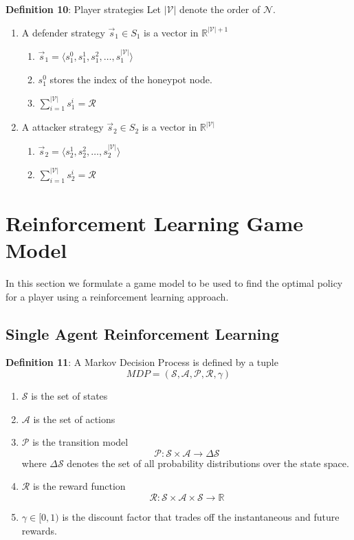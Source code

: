 \documentclass[conference]{IEEEtran}
\begin{document}
\textbf{Definition 10}: Player strategies
Let $|\mathcal{V}|$ denote the order of $\mathcal{N}$.
\begin{enumerate}
\item A defender strategy $\vec{s}_1 \in S_1$ is a vector in $\mathbb{R}^{|\mathcal{V}| + 1}$
\begin{enumerate}
\item $\vec{s}_1 = \langle s_1^0, s_1^1, s_1^2, \ldots, s_1^{|\mathcal{V}|} \rangle$
\item $s_1^0$ stores the index of the honeypot node.
\item $\displaystyle \sum_{i = 1}^{|\mathcal{V}|} s_1^i = \mathcal{R}$
\end{enumerate}
\item A attacker strategy $\vec{s}_2 \in S_2$ is a vector in $\mathbb{R}^{|\mathcal{V}|}$
\begin{enumerate}
\item $\vec{s}_2 = \langle s_2^1, s_2^2, \ldots, s_2^{|\mathcal{V}|} \rangle$
\item $\displaystyle \sum_{i = 1}^{|\mathcal{V}|} s_2^i = \mathcal{R}$
\end{enumerate}
\end{enumerate}


\section{Reinforcement Learning Game Model}
In this section we formulate a game model to be used to find the optimal policy for a player using a reinforcement learning approach.

\subsection{Single Agent Reinforcement Learning}

\textbf{Definition 11}: A Markov Decision Process is defined by a tuple $$MDP = (\mathcal{S}, \mathcal{A}, \mathcal{P}, \mathcal{R}, \gamma)$$
\begin{enumerate}
\item $\mathcal{S}$ is the set of states
\item $\mathcal{A}$ is the set of actions
\item $\mathcal{P}$ is the transition model $$\mathcal{P} \mathpunct{:} \mathcal{S} \times \mathcal{A} \to \Delta \mathcal{S}$$ where $\Delta \mathcal{S}$ denotes the set of all probability distributions over the state space.
\item $\mathcal{R}$ is the reward function
$$\mathcal{R} \mathpunct{:} \mathcal{S} \times \mathcal{A} \times \mathcal{S} \to \mathbb{R}$$
\item $\gamma \in [0, 1)$ is the discount factor that trades off the instantaneous and
future rewards.

\end{enumerate}
\end{document}
